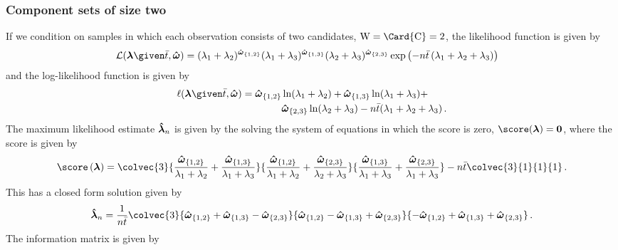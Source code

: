 \documentclass[../main.tex]{subfiles}
\begin{document}
\subsubsection{Component sets of size two}
If we condition on samples in which each observation consists of two 
candidates, $\RV{W} = \Card{\rvcand} = 2$, the likelihood function is 
given by
\begin{equation}
\begin{split}
    \likelihood(\vec\lambda \given \bar{t}, \cntsymb) &= (\lambda_1 + \lambda_2)^{\cnt{1,2}} (\lambda_1 + \lambda_3)^{\cnt{1,3}} (\lambda_2 + \lambda_3)^{\cnt{2,3}} \exp\left(-n \bar{t} \left(\lambda_1 + \lambda_2 + \lambda_3\right)\right)
\end{split}
\end{equation}
and the log-likelihood function is given by
\begin{equation}
\begin{split}
    \ell(\vec\lambda \given \bar{t}, \cntsymb) &= \cnt{1,2} \ln(\lambda_1 + \lambda_2) + \cnt{1,3} \ln(\lambda_1 + \lambda_3) + \\
        & \qquad \qquad \cnt{2,3} \ln(\lambda_2 + \lambda_3) - n \bar{t} (\lambda_1 + \lambda_2 + \lambda_3)\,.
\end{split}
\end{equation}
The maximum likelihood estimate $\boldsymbol{\hat{\lambda}}_n$ is given by the solving the system of equations in which the score is zero, $\score(\vec\lambda) = \vec{0}$, where the score is given by
\begin{equation}
\label{eq:score_expo}
    \score\left(\vec\lambda\right) = \colvec{3}
        {\frac{\cnt{1,2}}{\lambda_1 + \lambda_2} +  \frac{\cnt{1,3}}{\lambda_1 + \lambda_3}}
        {\frac{\cnt{1,2}}{\lambda_1 + \lambda_2} +  \frac{\cnt{2,3}}{\lambda_2 + \lambda_3}}
        {\frac{\cnt{1,3}}{\lambda_1 + \lambda_3} +  \frac{\cnt{2,3}}{\lambda_1 + \lambda_3}} -
        n \bar{t} \colvec{3}{1}{1}{1}\,.
\end{equation}
This has a closed form solution given by
\begin{equation}
    \expomle = \frac{1}{n \bar{t}} \colvec{3}
        {\cnt{1,2} + \cnt{1,3} - \cnt{2,3}}
        {\cnt{1,2} - \cnt{1,3} + \cnt{2,3}}
        {-\cnt{1,2} + \cnt{1,3} + \cnt{2,3}}\,.
\end{equation}
The information matrix is given by
\end{document}
